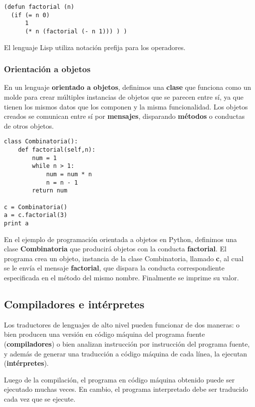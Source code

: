 \documentclass[spanish,A4,]{article}
\begin{document}
\begin{verbatim}
(defun factorial (n)
  (if (= n 0)
      1
      (* n (factorial (- n 1))) ) )
\end{verbatim}

El lenguaje Lisp utiliza notación prefija para los operadores.

\subsubsection{Orientación a objetos}\label{orientaciuxf3n-a-objetos}

En un lenguaje \textbf{orientado a objetos}, definimos una
\textbf{clase} que funciona como un molde para crear múltiples
instancias de objetos que se parecen entre sí, ya que tienen los mismos
datos que los componen y la misma funcionalidad. Los objetos creados se
comunican entre sí por \textbf{mensajes}, disparando \textbf{métodos} o
conductas de otros objetos.

\begin{verbatim}
class Combinatoria():
    def factorial(self,n): 
        num = 1
        while n > 1:
            num = num * n
            n = n - 1
        return num

c = Combinatoria()
a = c.factorial(3)
print a
\end{verbatim}

En el ejemplo de programación orientada a objetos en Python, definimos
una clase \textbf{Combinatoria} que producirá objetos con la conducta
\textbf{factorial}. El programa crea un objeto, instancia de la clase
Combinatoria, llamado \textbf{c}, al cual se le envía el mensaje
\textbf{factorial}, que dispara la conducta correspondiente especificada
en el método del mismo nombre. Finalmente se imprime su valor.

\subsection{Compiladores e
intérpretes}\label{compiladores-e-intuxe9rpretes}

Los traductores de lenguajes de alto nivel pueden funcionar de dos
maneras: o bien producen una versión en código máquina del programa
fuente (\textbf{compiladores}) o bien analizan instrucción por
instrucción del programa fuente, y además de generar una traducción a
código máquina de cada línea, la ejecutan (\textbf{intérpretes}).

Luego de la compilación, el programa en código máquina obtenido puede
ser ejecutado muchas veces. En cambio, el programa interpretado debe ser
traducido cada vez que se ejecute.
\end{document}
